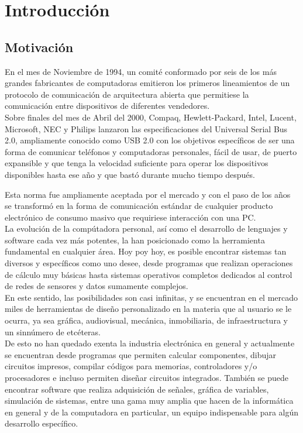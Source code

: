\chapter{Introducción}
  \section{Motivación}

En el mes de Noviembre de 1994, un comité conformado por seis de los más grandes fabricantes de computadoras
emitieron los primeros lineamientos de un protocolo de comunicación de arquitectura abierta que permitiese la
comunicación entre dispositivos de diferentes vendedores.\\

Sobre finales del mes de Abril del 2000, Compaq, Hewlett-Packard, Intel, Lucent, Microsoft, NEC y Philips
lanzaron las especificaciones del Universal Serial Bus 2.0, ampliamente conocido como USB 2.0 con los objetivos
específicos de ser una forma de comunicar teléfonos y computadoras personales, fácil de usar, de puerto expansible
y que tenga la velocidad suficiente para operar los dispositivos disponibles hasta ese año y que bastó durante
mucho tiempo después.%

Esta norma fue ampliamente aceptada por el mercado y con el paso de los años se transformó en la forma de comunicación
estándar de cualquier producto electrónico de consumo masivo que requiriese interacción con una PC.\\

La evolución de la compútadora personal, así como el desarrollo de lenguajes y software cada vez más
potentes, la han posicionado como la herramienta fundamental en cualquier área. Hoy poy hoy, es posible encontrar
sistemas tan diversos y específicos como uno desee, desde programas que realizan operaciones de cálculo
muy básicas hasta sistemas operativos completos dedicados al control de redes de sensores y datos
sumamente complejos.\\

En este sentido, las posibilidades son casi infinitas, y se encuentran en el mercado miles de herramientas
de diseño personalizado en la materia que al usuario se le ocurra, ya sea gráfica, audiovisual, mecánica,
inmobiliaria, de infraestructura y un sinnúmero de etcéteras.\\


De esto no han quedado exenta la industria electrónica en general y actualmente se encuentran desde programas que
permiten calcular componentes, dibujar circuitos impresos, compilar códigos para memorias, controladores y/o
procesadores e incluso permiten diseñar circuitos integrados. También se puede encontrar software que realiza
adquisición de señales, gráfica de variables, simulación de sistemas, entre una gama muy amplia que hacen de la
informática en general y de la computadora en particular, un equipo indispensable para algún desarrollo específico.\\


